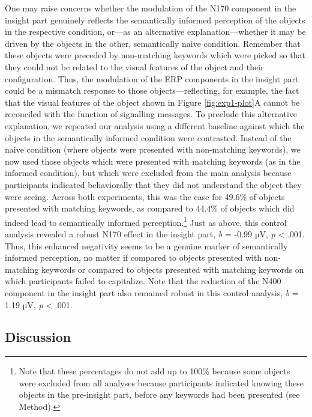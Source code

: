\documentclass[
  english,
  man,floatsintext]{apa7}
\begin{document}
One may raise concerns whether the modulation of the N170 component in the insight part genuinely reflects the semantically informed perception of the objects in the respective condition, or---as an alternative explanation---whether it may be driven by the objects in the other, semantically naive condition. Remember that these objects were preceded by non-matching keywords which were picked so that they could not be related to the visual features of the object and their configuration. Thus, the modulation of the ERP components in the insight part could be a mismatch response to those objects---reflecting, for example, the fact that the visual features of the object shown in Figure \ref{fig:exp1-plot}A cannot be reconciled with the function of signalling messages. To preclude this alternative explanation, we repeated our analysis using a different baseline against which the objects in the semantically informed condition were contrasted. Instead of the naive condition (where objects were presented with non-matching keywords), we now used those objects which were presented with matching keywords (as in the informed condition), but which were excluded from the main analysis because participants indicated behaviorally that they did not understand the object they were seeing. Across both experiments, this was the case for 49.6\% of objects presented with matching keywords, as compared to 44.4\% of objects which did indeed lead to semantically informed perception.\footnote{Note that these percentages do not add up to 100\% because some objects were excluded from all analyses because participants indicated knowing these objects in the pre-insight part, before any keywords had been presented (see Method).} Just as above, this control analysis revealed a robust N170 effect in the insight part, \emph{b} = -0.99 µV, \emph{p} \textless{} .001. Thus, this enhanced negativity seems to be a genuine marker of semantically informed perception, no matter if compared to objects presented with non-matching keywords or compared to objects presented with matching keywords on which participants failed to capitalize. Note that the reduction of the N400 component in the insight part also remained robust in this control analysis, \emph{b} = 1.19 µV, \emph{p} \textless{} .001.

\hypertarget{discussion-1}{%
\subsection{Discussion}\label{discussion-1}}
\end{document}

